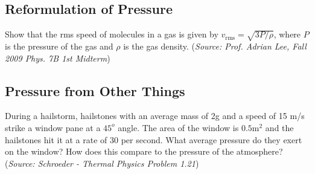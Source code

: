 \documentclass{article}
\begin{document}
\subsection{Reformulation of Pressure}

Show that the rms speed of molecules in a gas is given by $v_{\mathrm{rms}} = \sqrt{3P/\rho}$, where $P$ is the pressure of the gas and $\rho$ is the gas density. (\textit{Source: Prof. Adrian Lee, Fall 2009 Phys. 7B 1st Midterm})

\subsection{Pressure from Other Things}

During a hailstorm, hailstones with an average mass of 2g and a speed of 15 m/s strike a window pane at a $45^{o}$ angle. The area of the window is $0.5 \mathrm{m}^2$ and the hailstones hit it at a rate of 30 per second. What average pressure do they exert on the window? How does this compare to the pressure of the atmosphere? (\textit{Source: Schroeder - Thermal Physics Problem 1.21})
\end{document}
